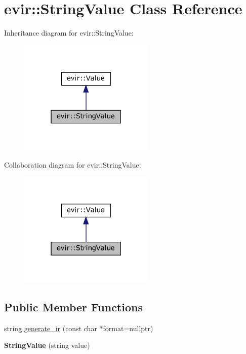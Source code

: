 \hypertarget{classevir_1_1StringValue}{}\section{evir\+:\+:String\+Value Class Reference}
\label{classevir_1_1StringValue}


Inheritance diagram for evir\+:\+:String\+Value\+:\nopagebreak
\begin{figure}[H]
\begin{center}
\leavevmode
\includegraphics[width=183pt]{classevir_1_1StringValue__inherit__graph}
\end{center}
\end{figure}


Collaboration diagram for evir\+:\+:String\+Value\+:\nopagebreak
\begin{figure}[H]
\begin{center}
\leavevmode
\includegraphics[width=183pt]{classevir_1_1StringValue__coll__graph}
\end{center}
\end{figure}
\subsection*{Public Member Functions}
\begin{DoxyCompactItemize}
\item 
string \hyperlink{classevir_1_1StringValue_ae635609dfe7acf237b71bdb48625712e}{generate\+\_\+ir} (const char $\ast$format=nullptr)
\item 
\mbox{\label{classevir_1_1StringValue_a91176d5ea0ac4df11329e8a53eff3f21}} 
{\bfseries String\+Value} (string value)
\end{DoxyCompactItemize}
